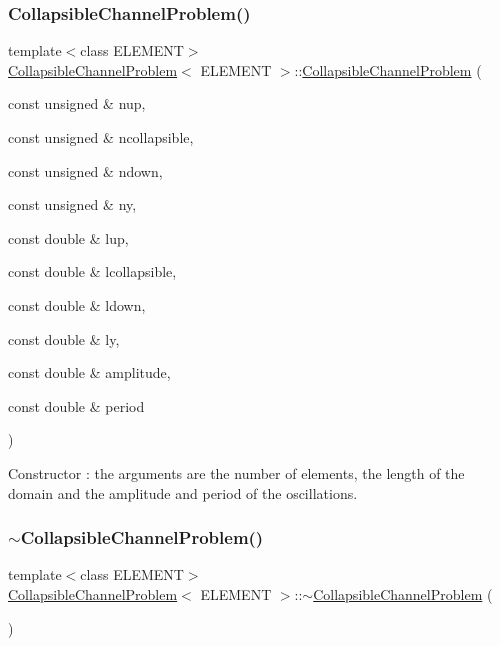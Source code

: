 \subsubsection{\texorpdfstring{Collapsible\+Channel\+Problem()}{CollapsibleChannelProblem()}\hspace{0.1cm}{\footnotesize\ttfamily [2/2]}}
{\footnotesize\ttfamily template$<$class E\+L\+E\+M\+E\+NT$>$ \\
\hyperlink{classCollapsibleChannelProblem}{Collapsible\+Channel\+Problem}$<$ E\+L\+E\+M\+E\+NT $>$\+::\hyperlink{classCollapsibleChannelProblem}{Collapsible\+Channel\+Problem} (\begin{DoxyParamCaption}\item[{const unsigned \&}]{nup,  }\item[{const unsigned \&}]{ncollapsible,  }\item[{const unsigned \&}]{ndown,  }\item[{const unsigned \&}]{ny,  }\item[{const double \&}]{lup,  }\item[{const double \&}]{lcollapsible,  }\item[{const double \&}]{ldown,  }\item[{const double \&}]{ly,  }\item[{const double \&}]{amplitude,  }\item[{const double \&}]{period }\end{DoxyParamCaption})}



Constructor \+: the arguments are the number of elements, the length of the domain and the amplitude and period of the oscillations. 

\mbox{\label{classCollapsibleChannelProblem_a205e3e654d3205d1d55ac46e7b63ca9d}} 
\subsubsection{\texorpdfstring{$\sim$\+Collapsible\+Channel\+Problem()}{~CollapsibleChannelProblem()}\hspace{0.1cm}{\footnotesize\ttfamily [2/2]}}
{\footnotesize\ttfamily template$<$class E\+L\+E\+M\+E\+NT$>$ \\
\hyperlink{classCollapsibleChannelProblem}{Collapsible\+Channel\+Problem}$<$ E\+L\+E\+M\+E\+NT $>$\+::$\sim$\hyperlink{classCollapsibleChannelProblem}{Collapsible\+Channel\+Problem} (\begin{DoxyParamCaption}{ }\end{DoxyParamCaption})\hspace{0.3cm}{\ttfamily [inline]}}



